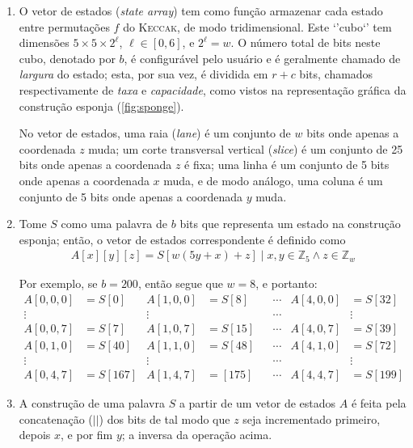 \documentclass{article}
\begin{document}
\begin{enumerate}[label=(\alph*)]

\item O vetor de estados (\emph{state array}) tem como função armazenar
cada estado entre permutações $f$ do \textsc{Keccak}, de modo tridimensional.
Este `'cubo`' tem dimensões $5 \times 5 \times 2^{\ell}$, $\ell \in [0, 6]$, e
$2^{\ell} = w$. O número total de bits neste cubo, denotado por $b$, é
configurável pelo usuário e é geralmente chamado de \emph{largura} do estado;
esta, por sua vez, é dividida em $r + c$ bits, chamados respectivamente de
\emph{taxa} e \emph{capacidade}, como vistos na representação gráfica da
construção esponja (\ref{fig:sponge}).

No vetor de estados, uma raia (\emph{lane}) é um conjunto de $w$ bits onde
apenas a coordenada $z$ muda; um corte transversal vertical (\emph{slice}) é
um conjunto de 25 bits onde apenas a coordenada $z$ é fixa; uma linha é um
conjunto de 5 bits onde apenas a coordenada $x$ muda, e de modo análogo, uma
coluna é um conjunto de 5 bits onde apenas a coordenada $y$ muda.

\item Tome $S$ como uma palavra de $b$ bits que representa um estado na
construção esponja; então, o vetor de estados correspondente é definido como
\begin{align*}
    A[x][y][z] = S[w(5y+x)+z]
    \mid x, y \in \mathbb{Z}_5 \land z \in \mathbb{Z}_w
\end{align*}

Por exemplo, se $b = 200$, então segue que $w = 8$, e portanto:
\begin{align*}
    A[0, 0, 0] &= S[0]   & A[1, 0, 0] &= S[8]  & & \cdots & A[4, 0, 0] &= S[32] \\
    \vdots && \vdots &&& \cdots && \vdots \\
    A[0, 0, 7] &= S[7]   & A[1, 0, 7] &= S[15] & & \cdots & A[4, 0, 7] &= S[39] \\
    A[0, 1, 0] &= S[40]  & A[1, 1, 0] &= S[48] & & \cdots & A[4, 1, 0] &= S[72] \\
    \vdots && \vdots &&& \cdots && \vdots \\
    A[0, 4, 7] &= S[167] & A[1, 4, 7] &= [175] & & \cdots & A[4, 4, 7] &= S[199]
\end{align*}

\item A construção de uma palavra $S$ a partir de um vetor de estados $A$ é
feita pela concatenação ($||$) dos bits de tal modo que $z$ seja incrementado
primeiro, depois $x$, e por fim $y$; a inversa da operação acima.


\end{enumerate}
\end{document}
